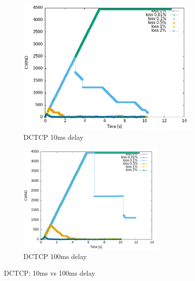 \documentclass{exam}
\begin{document}
\begin{figure}[h]
    \centering
    \begin{subfigure}{0.45\textwidth}
        \centering
        \includegraphics[width=0.8\linewidth]{dctcp_10ms.png}
        \caption{DCTCP 10ms delay}
    \end{subfigure}
    \begin{subfigure}{0.45\textwidth}
        \centering
        \includegraphics[width=0.8\textwidth]{dctcp_100ms.png}
        \caption{DCTCP 100ms delay}
    \end{subfigure}
    \caption{DCTCP: 10ms vs 100ms delay}
    \label{fig:dctcp_delays}
\end{figure}
\end{document}
